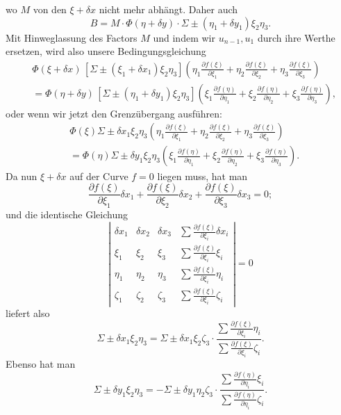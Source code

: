 \documentclass[10pt]{article}
\begin{document}
wo \(M\) von den \(\xi+\delta x\) nicht mehr abhängt. Daher auch
\[
B=M\cdot\Phi(\eta+\delta y)\cdot\Sigma\pm(\eta_1+\delta y_1)\xi_2\eta_3.
\]
Mit Hinweglassung des Factors \(M\) und indem wir \(u_{n-1},u_1\) durch ihre Werthe ersetzen, wird also unsere Bedingungsgleichung
\[
\begin{aligned}
&\Phi(\xi+\delta x)\,[\Sigma\pm(\xi_1+\delta x_1)\xi_2\eta_3]
\left(\eta_1\frac{\partial f(\xi)}{\partial\xi_1}+\eta_2\frac{\partial f(\xi)}{\partial\xi_2}+\eta_3\frac{\partial f(\xi)}{\partial\xi_3}\right)\\
&=\Phi(\eta+\delta y)\,[\Sigma\pm(\eta_1+\delta y_1)\xi_2\eta_3]
\left(\xi_1\frac{\partial f(\eta)}{\partial\eta_1}+\xi_2\frac{\partial f(\eta)}{\partial\eta_2}+\xi_3\frac{\partial f(\eta)}{\partial\eta_3}\right),
\end{aligned}
\]
oder wenn wir jetzt den Grenzübergang ausführen:
\[
\begin{aligned}
&\Phi(\xi)\Sigma\pm\delta x_1\xi_2\eta_3
\left(\eta_1\frac{\partial f(\xi)}{\partial\xi_1}+\eta_2\frac{\partial f(\xi)}{\partial\xi_2}+\eta_3\frac{\partial f(\xi)}{\partial\xi_3}\right)\\
&=\Phi(\eta)\Sigma\pm\delta y_1\xi_2\eta_3
\left(\xi_1\frac{\partial f(\eta)}{\partial\eta_1}+\xi_2\frac{\partial f(\eta)}{\partial\eta_2}+\xi_3\frac{\partial f(\eta)}{\partial\eta_3}\right).
\end{aligned}
\]
Da nun \(\xi+\delta x\) auf der Curve \(f=0\) liegen muss, hat man
\[
\frac{\partial f(\xi)}{\partial\xi_1}\delta x_1
+\frac{\partial f(\xi)}{\partial\xi_2}\delta x_2
+\frac{\partial f(\xi)}{\partial\xi_3}\delta x_3=0;
\]
und die identische Gleichung
\[
\left|
\begin{array}{cccc}
\delta x_1&\delta x_2&\delta x_3&\displaystyle\sum\frac{\partial f(\xi)}{\partial\xi_i}\delta x_i\\
\xi_1&\xi_2&\xi_3&\displaystyle\sum\frac{\partial f(\xi)}{\partial\xi_i}\xi_i\\
\eta_1&\eta_2&\eta_3&\displaystyle\sum\frac{\partial f(\xi)}{\partial\xi_i}\eta_i\\
\zeta_1&\zeta_2&\zeta_3&\displaystyle\sum\frac{\partial f(\xi)}{\partial\xi_i}\zeta_i
\end{array}
\right|=0
\]
liefert also
\[
\Sigma\pm\delta x_1\xi_2\eta_3=
\Sigma\pm\delta x_1\xi_2\zeta_3\cdot
\frac{\displaystyle\sum\frac{\partial f(\xi)}{\partial\xi_i}\eta_i}
{\displaystyle\sum\frac{\partial f(\xi)}{\partial\xi_i}\zeta_i}.
\]
Ebenso hat man
\[
\Sigma\pm\delta y_1\xi_2\eta_3=
-\Sigma\pm\delta y_1\eta_2\zeta_3\cdot
\frac{\displaystyle\sum\frac{\partial f(\eta)}{\partial\eta_i}\xi_i}
{\displaystyle\sum\frac{\partial f(\eta)}{\partial\eta_i}\zeta_i}.
\]
\end{document}
